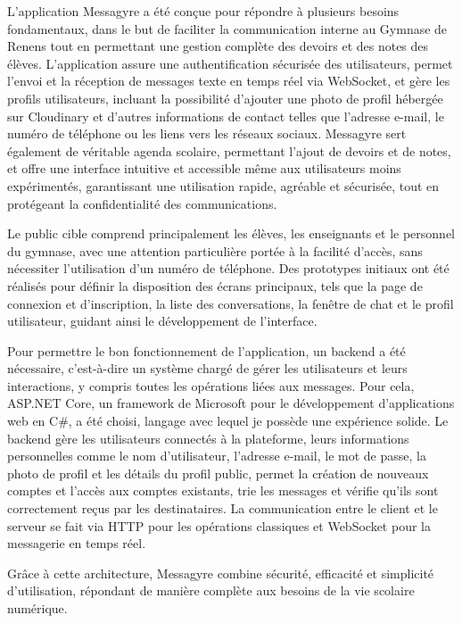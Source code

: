 \documentclass[12pt]{report}
\begin{document}
L’application Messagyre a été conçue pour répondre à plusieurs besoins fondamentaux, dans le but de faciliter la communication interne au Gymnase de Renens tout en permettant une gestion complète des devoirs et des notes des élèves. L’application assure une authentification sécurisée des utilisateurs, permet l’envoi et la réception de messages texte en temps réel via WebSocket\supercite{websocket}, et gère les profils utilisateurs, incluant la possibilité d’ajouter une photo de profil hébergée sur Cloudinary\supercite{cloudinary} et d’autres informations de contact telles que l’adresse e-mail, le numéro de téléphone ou les liens vers les réseaux sociaux. Messagyre sert également de véritable agenda scolaire, permettant l’ajout de devoirs et de notes, et offre une interface intuitive et accessible même aux utilisateurs moins expérimentés, garantissant une utilisation rapide, agréable et sécurisée, tout en protégeant la confidentialité des communications\supercite{http}.

Le public cible comprend principalement les élèves, les enseignants et le personnel du gymnase, avec une attention particulière portée à la facilité d’accès, sans nécessiter l’utilisation d’un numéro de téléphone. Des prototypes initiaux ont été réalisés pour définir la disposition des écrans principaux, tels que la page de connexion et d’inscription, la liste des conversations, la fenêtre de chat et le profil utilisateur, guidant ainsi le développement de l’interface.

Pour permettre le bon fonctionnement de l’application, un backend a été nécessaire, c’est-à-dire un système chargé de gérer les utilisateurs et leurs interactions, y compris toutes les opérations liées aux messages. Pour cela, ASP.NET Core\supercite{aspnetcore}, un framework de Microsoft pour le développement d’applications web en C\#\supercite{csharp}, a été choisi, langage avec lequel je possède une expérience solide. Le backend gère les utilisateurs connectés à la plateforme, leurs informations personnelles comme le nom d’utilisateur, l’adresse e-mail, le mot de passe, la photo de profil et les détails du profil public, permet la création de nouveaux comptes et l’accès aux comptes existants, trie les messages et vérifie qu’ils sont correctement reçus par les destinataires. La communication entre le client et le serveur se fait via HTTP\supercite{http} pour les opérations classiques et WebSocket\supercite{websocket} pour la messagerie en temps réel.

Grâce à cette architecture, Messagyre combine sécurité, efficacité et simplicité d’utilisation, répondant de manière complète aux besoins de la vie scolaire numérique.
\end{document}
